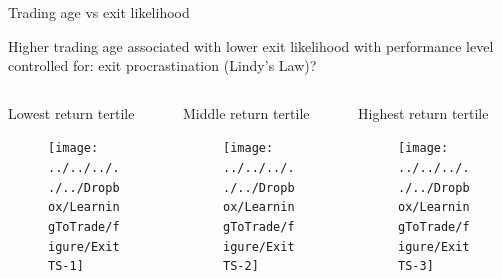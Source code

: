 \documentclass{beamer}
\begin{document}
\begin{frame}{Trading age vs exit likelihood}

Higher trading age associated with lower exit likelihood with performance level controlled for: exit procrastination (Lindy's Law)?

	\begin{columns}[t]
		\begin{column}{0.32\textwidth}
			\begin{block}{\small Lowest return tertile}
				\begin{figure}
					\texttt{[image: ../../../../../Dropbox/LearningToTrade/figure/ExitTS-1]}
				\end{figure}
			\end{block}
		\end{column}

		\begin{column}{0.32\textwidth}
			\begin{block}{\small Middle return tertile}
				\begin{figure}
					\texttt{[image: ../../../../../Dropbox/LearningToTrade/figure/ExitTS-2]}
				\end{figure}
			\end{block}
		\end{column}

		\begin{column}{0.32\textwidth}
			\begin{block}{\small Highest return tertile}
				\begin{figure}
					\texttt{[image: ../../../../../Dropbox/LearningToTrade/figure/ExitTS-3]}
				\end{figure}
			\end{block}
		\end{column}
	\end{columns}

\end{frame}
\end{document}
